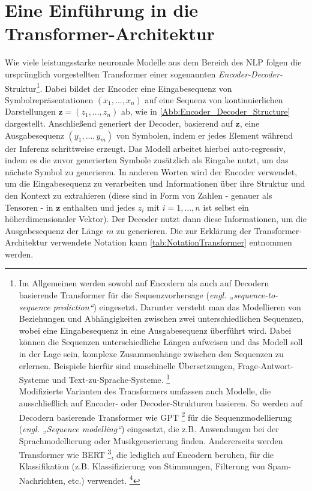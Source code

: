 \section*{Eine Einführung in die Transformer-Architektur}
Wie viele leistungsstarke neuronale Modelle aus dem Bereich des NLP folgen die ursprünglich vorgestellten Transformer einer sogenannten \emph{Encoder-Decoder-}Struktur\footnote{Im Allgemeinen werden sowohl auf Encodern als auch auf Decodern basierende Transformer für die Sequenzvorhersage (\emph{engl. „sequence-to-sequence prediction“}) eingesetzt. Darunter versteht man das Modellieren von Beziehungen und Abhängigkeiten zwischen zwei unterschiedlichen Sequenzen, wobei eine Eingabesequenz in eine Ausgabesequenz überführt wird. Dabei können die Sequenzen unterschiedliche Längen aufweisen und das Modell soll in der Lage sein, komplexe Zusammenhänge zwischen den Sequenzen zu erlernen. Beispiele hierfür sind maschinelle Übersetzungen, Frage-Antwort-Systeme und Text-zu-Sprache-Systeme. \footcite{Formal_Algorithms_for_Transformers_DeepMind}\\Modifizierte Varianten des Transformers umfassen auch Modelle, die ausschließlich auf Encoder- oder Decoder-Strukturen basieren. So werden auf Decodern basierende Transformer wie GPT \footcite{GPT} für die Sequenzmodellierung (\emph{engl. „Sequence modelling“}) eingesetzt, die z.B. Anwendungen bei der Sprachmodellierung oder Musikgenerierung finden. Andererseits werden Transformer wie BERT \footcite{BERT}, die lediglich auf Encodern beruhen, für die Klassifikation (z.B. Klassifizierung von Stimmungen, Filterung von Spam-Nachrichten, etc.) verwendet. \footcite{Formal_Algorithms_for_Transformers_DeepMind}}. Dabei bildet der Encoder eine Eingabesequenz von Symbolrepräsentationen $(x_1, ..., x_n)$ auf eine Sequenz von kontinuierlichen Darstellungen $\mathbf{z} = (z_1, ..., z_n)$ ab, wie in \cref{Abb:Encoder_Decoder_Structure} dargestellt. Anschließend generiert der Decoder, basierend auf $\mathbf{z}$, eine Ausgabesequenz $(y_1, ..., y_m)$ von Symbolen, indem er jedes Element während der Inferenz schrittweise erzeugt. Das Modell arbeitet hierbei auto-regressiv, indem es die zuvor generierten Symbole zusätzlich als Eingabe nutzt, um das nächste Symbol zu generieren. In anderen Worten wird der Encoder verwendet, um die Eingabesequenz zu verarbeiten und Informationen über ihre Struktur und den Kontext zu extrahieren (diese sind in Form von Zahlen - genauer als Tensoren - in $\mathbf{z}$ enthalten und jedes $z_i$ mit $i=1,...,n$ ist selbst ein höherdimensionaler Vektor). Der Decoder nutzt dann diese Informationen, um die Ausgabesequenz der Länge $m$ zu generieren. Die zur Erklärung der Transformer-Architektur verwendete Notation kann \cref{tab:NotationTransformer} entnommen werden.

